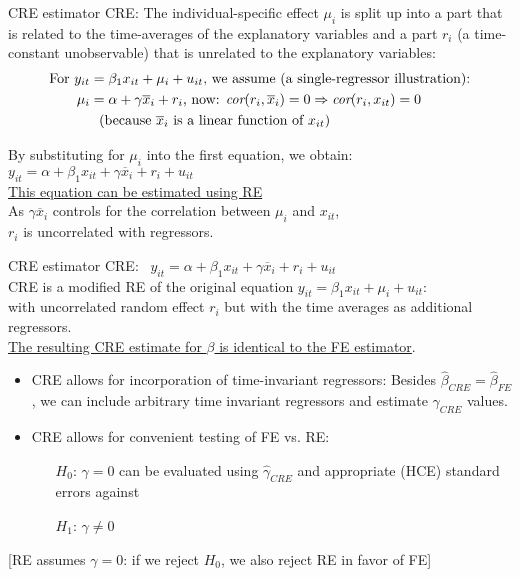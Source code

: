\documentclass{beamer}
\begin{document}
\begin{frame}{CRE estimator}
CRE: The individual-specific effect $\mu_i$ is split up into a part that is related to the time-averages of the explanatory variables and a part $r_i$ (a time-constant unobservable) that is unrelated to the explanatory variables: 
\begin{align*}
\textnormal{For } y_{it} & =  \beta_1 x_{it} + \mu_i + u_{it}\textnormal{, we assume (a single-regressor illustration):}\\ \vspace{0.3cm}
\mu_i & = \alpha + \gamma \overline{x}_i + r_i \textnormal{, now: } \textit{cor}(r_i, \overline{x}_i) = 0 \Rightarrow \textit{cor}(r_i,x_{it}) = 0\\ 
&\textnormal{~~(because $\overline{x}_i$  is a linear function of  $x_{it}$)}
\end{align*}

By substituting for $\mu_i$ into the first equation, we obtain: \\
$y_{it} = \alpha + \beta_1 x_{it} + \gamma \overline{x}_i + r_i + u_{it}$ \\
\bigskip
\underline{This equation can be estimated using RE}\\
As $\gamma \overline{x}_i$ controls for the correlation between $\mu_i$ and $x_{it}$, \\$r_i$ is uncorrelated with regressors.
\end{frame}
\begin{frame}{CRE estimator}
CRE: \ $y_{it} = \alpha + \beta_1 x_{it} + \gamma \overline{x}_i + r_i + u_{it}$ \\
\medskip
\small CRE is a modified RE of the original equation $y_{it} =  \beta_1 x_{it} + \mu_i + u_{it}$: \\
\vspace{0.2cm}
with uncorrelated random effect $r_i$ but with the time averages as additional regressors. \\
\vspace{0.3cm}
\underline{The resulting CRE estimate for $\beta$ is identical to the FE estimator}.
\begin{itemize}
\item CRE allows for incorporation of time-invariant regressors: Besides $\hat{\beta}_{\textit{CRE}} = \hat{\beta}_{\textit{FE}}$, we can include arbitrary time invariant regressors and estimate $\gamma_{\textit{CRE}}$ values.
\item CRE allows for convenient testing of FE vs. RE:
	\begin{itemize}
	\item[$H_0$:] $\gamma = 0$ can be evaluated using $\hat{\gamma}_{\textit{CRE}}$ and appropriate (HCE) standard errors against
	\item[$H_1$:] $\gamma \neq 0$
	\end{itemize}
\end{itemize}
[RE assumes $\gamma = 0$: if we reject $H_0$, we also reject RE in favor of FE]
\end{frame}
\end{document}
